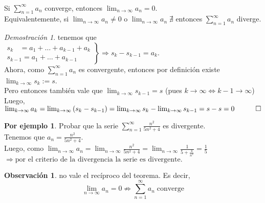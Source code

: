 \documentclass{article}
\theoremstyle{definition}
\theoremstyle{definition}
\newtheorem*{obs}{Observación}
\newtheorem*{ej}{Por ejemplo}
\theoremstyle{remark}
\newtheorem*{demo}{Demostración}
\begin{document}
\begin{teo} \; \\
  Si $\sum_{n=1}^{\infty}{a_n}$ converge, entonces $\lim_{n \to \infty}{a_n}=0$. \\ 
  Equivalentemente, si $\lim_{n \to \infty}{a_n} \neq 0$ o $\lim_{n \to \infty}{a_n} \; \nexists$ entonces $\sum_{n=1}^{\infty}{a_n}$ diverge.
\end{teo}
\pagebreak
\begin{demo} tenemos que \\
$\left.\begin{array}{l}
  s_{k\phantom{-1}}=a_1+\dots+a_{k-1}+a_k \\
  s_{k-1}=a_1+\dots+a_{k-1}
\end{array}\right\} \Rightarrow s_k-s_{k-1}=a_k.$\\
Ahora, como $\sum_{n=1}^{\infty}{a_n}$ es convergente, entonces por definición existe $\lim_{k \to \infty}{s_k}:=s$. \\
Pero entonces también vale que $\lim_{k \to \infty}{s_{k-1}}=s$ \quad \big(pues $k\to\infty \Leftrightarrow k-1 \to \infty $\big)\\
Luego, $\lim_{k\to\infty}{a_k} = \lim_{k\to\infty}{\left(s_k-s_{k-1}\right)}=\lim_{k\to\infty}{s_k} - \lim_{k\to\infty}{s_{k-1}}=s-s=0 \quad \qed $
\end{demo}
\begin{ej}
  Probar que la serie $\sum_{n=1}^{\infty}{\frac{n^2}{5n^2+4}}$ es divergente. \\
  Tenemos que $a_n=\frac{n^2}{5n^2+4}.$ \\
  Luego, como $\lim_{n\to\infty}{a_n}=\lim_{n\to\infty}{\frac{n^2}{5n^2+4}}=\lim_{n\to\infty}{\frac{1}{5+\frac{4}{n^2}}}=\frac{1}{5}$ \\
  $\Rightarrow \; \text{por el criterio de la divergencia la serie es divergente.}$
\end{ej}
\begin{obs}
  no vale el recíproco del teorema. Es decir, \\
  $$\lim_{n\to\infty}{a_n=0}\not\Rightarrow \sum_{n=1}^{\infty}{a_n} \; \text{converge}$$
\end{obs}
\end{document}
